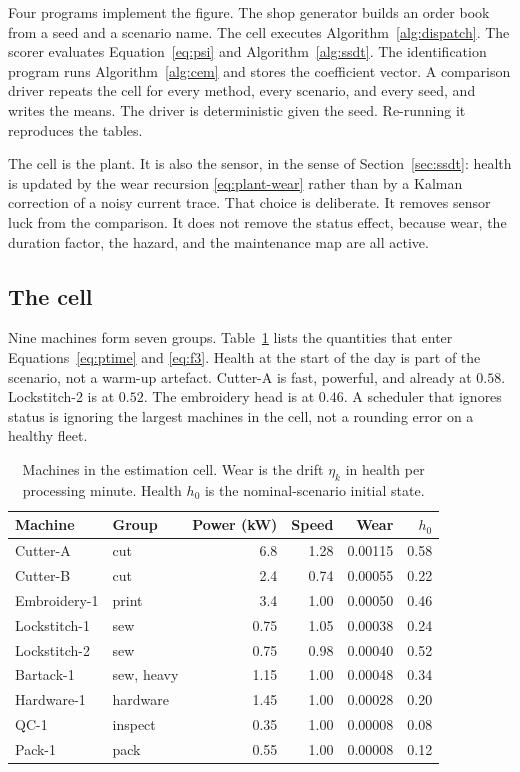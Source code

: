 Four programs implement the figure. The shop generator builds an order book from a seed and a scenario name. The cell executes Algorithm~\ref{alg:dispatch}. The scorer evaluates Equation~\eqref{eq:psi} and Algorithm~\ref{alg:ssdt}. The identification program runs Algorithm~\ref{alg:cem} and stores the coefficient vector. A comparison driver repeats the cell for every method, every scenario, and every seed, and writes the means. The driver is deterministic given the seed. Re-running it reproduces the tables.

The cell is the plant. It is also the sensor, in the sense of Section~\ref{sec:ssdt}: health is updated by the wear recursion \eqref{eq:plant-wear} rather than by a Kalman correction of a noisy current trace. That choice is deliberate. It removes sensor luck from the comparison. It does not remove the status effect, because wear, the duration factor, the hazard, and the maintenance map are all active.

\subsection{The cell}

Nine machines form seven groups. Table~\ref{tab:machines} lists the quantities that enter Equations~\eqref{eq:ptime} and \eqref{eq:f3}. Health at the start of the day is part of the scenario, not a warm-up artefact. Cutter-A is fast, powerful, and already at \(0.58\). Lockstitch-2 is at \(0.52\). The embroidery head is at \(0.46\). A scheduler that ignores status is ignoring the largest machines in the cell, not a rounding error on a healthy fleet.

\begin{table}[ht]
\centering
\caption{Machines in the estimation cell. Wear is the drift \(\eta_k\) in health per processing minute. Health \(h_0\) is the nominal-scenario initial state.}
\label{tab:machines}
\small
\begin{tabular}{llrrrr}
\toprule
Machine & Group & Power (kW) & Speed & Wear & \(h_0\) \\
\midrule
Cutter-A & cut & 6.8 & 1.28 & 0.00115 & 0.58 \\
Cutter-B & cut & 2.4 & 0.74 & 0.00055 & 0.22 \\
Embroidery-1 & print & 3.4 & 1.00 & 0.00050 & 0.46 \\
Lockstitch-1 & sew & 0.75 & 1.05 & 0.00038 & 0.24 \\
Lockstitch-2 & sew & 0.75 & 0.98 & 0.00040 & 0.52 \\
Bartack-1 & sew, heavy & 1.15 & 1.00 & 0.00048 & 0.34 \\
Hardware-1 & hardware & 1.45 & 1.00 & 0.00028 & 0.20 \\
QC-1 & inspect & 0.35 & 1.00 & 0.00008 & 0.08 \\
Pack-1 & pack & 0.55 & 1.00 & 0.00008 & 0.12 \\
\bottomrule
\end{tabular}
\end{table}


